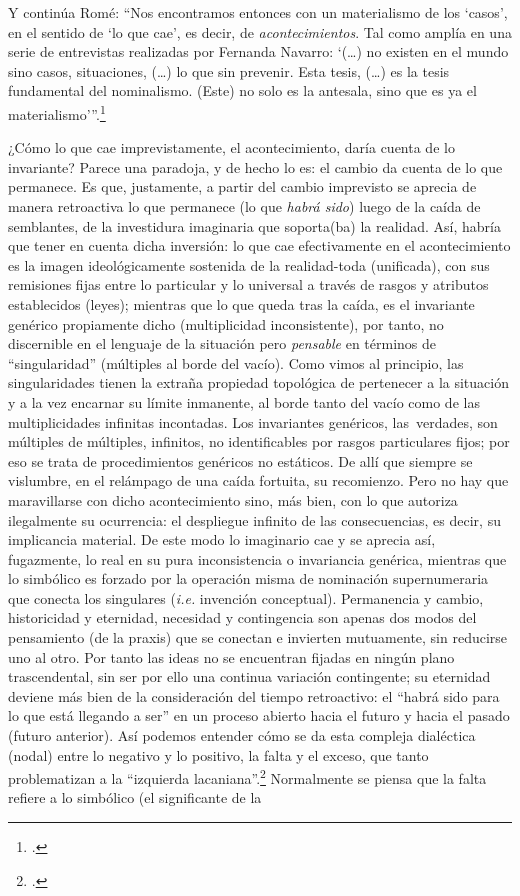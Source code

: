 Y continúa Romé: \enquote{Nos encontramos entonces con un materialismo de los \enquote{casos}, en el sentido de \enquote{lo que cae}, es decir, de \emph{acontecimientos}. Tal como amplía en una serie de entrevistas realizadas por Fernanda Navarro: \enquote{(\ldots)  no existen en el mundo sino casos, situaciones, (\ldots) lo que  sin prevenir. Esta tesis, (\ldots) es la tesis fundamental del nominalismo. (Este) no solo es la antesala, sino que es ya el materialismo}}.\footcite[][]{@7075-ROME2009}

¿Cómo lo que cae imprevistamente, el acontecimiento, daría cuenta de lo invariante? Parece una paradoja, y de hecho lo es: el cambio da cuenta de lo que permanece. Es que, justamente, a partir del cambio imprevisto se aprecia de manera retroactiva lo que permanece (lo que \emph{habrá sido}) luego de la caída de semblantes, de la investidura imaginaria que soporta(ba) la realidad. Así, habría que tener en cuenta dicha inversión: lo que cae efectivamente en el acontecimiento es la imagen ideológicamente sostenida de la realidad-toda (unificada), con sus remisiones fijas entre lo particular y lo universal a través de rasgos y atributos establecidos (leyes); mientras que lo que queda  tras la caída, es el invariante genérico propiamente dicho (multiplicidad inconsistente), por tanto, no discernible en el lenguaje de la situación pero \emph{pensable} en términos de \enquote{singularidad} (múltiples al borde del vacío). Como vimos al principio, las singularidades tienen la extraña propiedad topológica de pertenecer a la situación y a la vez encarnar su límite inmanente, al borde tanto del vacío como de las multiplicidades infinitas incontadas. Los invariantes genéricos, las~verdades, son múltiples de múltiples, infinitos, no identificables por rasgos particulares fijos; por eso se trata de procedimientos genéricos no estáticos. De allí que siempre se vislumbre, en el relámpago de una caída fortuita, su recomienzo. Pero no hay que maravillarse con dicho acontecimiento sino, más bien, con lo que autoriza ilegalmente su ocurrencia: el despliegue infinito de las consecuencias, es decir, su implicancia material. De este modo lo imaginario cae y se aprecia así, fugazmente, lo real en su pura inconsistencia o invariancia genérica, mientras que lo simbólico es forzado por la operación misma de nominación supernumeraria que conecta los singulares (\emph{i.e.} invención conceptual). Permanencia y cambio, historicidad y eternidad, necesidad y contingencia son apenas dos modos del pensamiento (de la praxis) que se conectan e invierten mutuamente, sin reducirse uno al otro. Por tanto las ideas no se encuentran fijadas en ningún plano trascendental, sin ser por ello una continua variación contingente; su eternidad deviene más bien de la consideración del tiempo retroactivo: el \enquote{habrá sido para lo que está llegando a ser} en un proceso abierto hacia el futuro y hacia el pasado (futuro anterior). Así podemos entender cómo se da esta compleja dialéctica (nodal) entre lo negativo y lo positivo, la falta y el exceso, que tanto problematizan a la \enquote{izquierda lacaniana}.\footcite[Véase][]{@7003-STAVRAKAKIS2010} Normalmente se piensa que la falta refiere a lo simbólico (el significante de la 